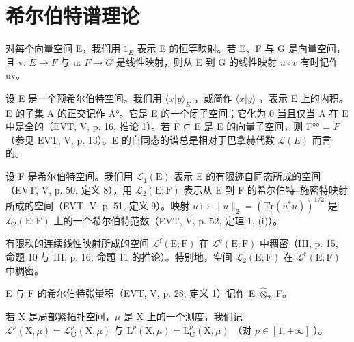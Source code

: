 \chapter{希尔伯特谱理论}
\setcounter{exercisepar}{0}

对每个向量空间 E，我们用 \(1_{E}\) 表示 E 的恒等映射。若 E、F 与 G 是向量空间，且 v: \(E \rightarrow F\) 与 u: \(F \rightarrow G\) 是线性映射，则从 E 到 G 的线性映射 \(u \circ v\) 有时记作 uv。

设 E 是一个预希尔伯特空间。我们用 \(\langle x|y\rangle_{E}\) ，或简作 \(\langle x|y\rangle\) ，表示 E 上的内积。E 的子集 A 的正交记作 A°。它是 E 的一个闭子空间；它化为 0 当且仅当 A 在 E 中是全的（EVT, V, p. 16, 推论 1）。若 F ⊂ E 是 E 的向量子空间，则 F°° = \(\overline{F}\) （参见 EVT, V, p. 13）。E 的自同态的谱总是相对于巴拿赫代数 \(\mathcal{L}(E)\) 而言的。

设 F 是希尔伯特空间。我们用 \(\mathcal{L}_1(\mathrm{E})\) 表示 E 的有限迹自同态所成的空间（EVT, V, p. 50, 定义 8），用 \(\mathcal{L}_2(\mathrm{E};\mathrm{F})\) 表示从 E 到 F 的希尔伯特–施密特映射所成的空间（EVT, V, p. 51, 定义 9）。映射 \(u\mapsto \| u\| _2 = (\mathrm{Tr}(u^{*}u))^{1 / 2}\) 是 \(\mathcal{L}_2(\mathrm{E};\mathrm{F})\) 上的一个希尔伯特范数（EVT, V, p. 52, 定理 1, (i)）。

有限秩的连续线性映射所成的空间 \(\mathcal{L}^{\mathrm{f}}(\mathrm{E};\mathrm{F})\) 在 \(\mathcal{L}^{\mathrm{c}}(\mathrm{E};\mathrm{F})\) 中稠密（III, p. 15, 命题 10 与 III, p. 16, 命题 11 的推论）。特别地，空间 \(\mathcal{L}_2(\mathrm{E};\mathrm{F})\) 在 \(\mathcal{L}^{\mathrm{c}}(\mathrm{E};\mathrm{F})\) 中稠密。

E 与 F 的希尔伯特张量积（EVT, V, p. 28, 定义 1）记作 E \(\widehat{\otimes}_2\) F。

若 X 是局部紧拓扑空间，\(\mu\) 是 X 上的一个测度，我们记 \(\mathcal{L}^{p}(\mathrm{X},\mu)=\mathcal{L}_{\mathbf{C}}^{p}(\mathrm{X},\mu)\) 与 \(\mathrm{L}^{p}(\mathrm{X},\mu)=\mathrm{L}_{\mathbf{C}}^{p}(\mathrm{X},\mu)\) （对 \(p\in[1,+\infty]\) ）。

